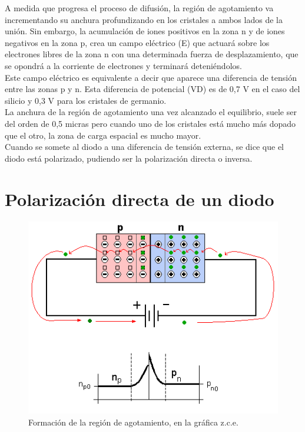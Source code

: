 \documentclass{article}
\begin{document}
A medida que progresa el proceso de difusión, la región de agotamiento va incrementando su anchura profundizando en los cristales a ambos lados de la unión. Sin embargo, la acumulación de iones positivos en la zona n y de iones negativos en la zona p, crea un campo eléctrico (E) que actuará sobre los electrones libres de la zona n con una determinada fuerza de desplazamiento, que se opondrá a la corriente de electrones y terminará deteniéndolos.\citep{diodoWiki}\\

Este campo eléctrico es equivalente a decir que aparece una diferencia de tensión entre las zonas p y n. Esta diferencia de potencial (VD) es de 0,7 V en el caso del silicio y 0,3 V para los cristales de germanio.\citep{diodoWiki}\\

La anchura de la región de agotamiento una vez alcanzado el equilibrio, suele ser del orden de 0,5 micras pero cuando uno de los cristales está mucho más dopado que el otro, la zona de carga espacial es mucho mayor.\citep{diodoWiki}\\

Cuando se somete al diodo a una diferencia de tensión externa, se dice que el diodo está polarizado, pudiendo ser la polarización directa o inversa.\citep{diodoWiki}\\

\section{Polarización directa de un diodo}

\begin{figure}[h!]
\centering
\includegraphics[scale=0.4]{PolDir.png}
\caption{Formación de la región de agotamiento, en la gráfica z.c.e.}
\label{fig:diodoDir}
\end{figure}
\end{document}
